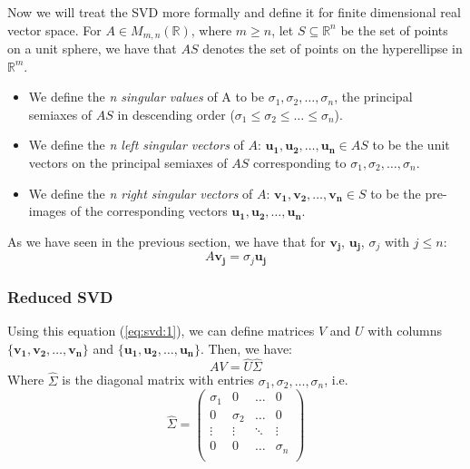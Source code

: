 \documentclass[12pt,reqno,twoside,titlepage]{article}
\theoremstyle{definition}
\begin{document}
Now we will treat the SVD more formally and define it for finite dimensional real vector space.
For $A \in M_{m,n}(\mathbb{R})$, where $m \geq n$, let  $S \subseteq \mathbb{R}^n$ be the set of points on a unit sphere, we have that $AS$ denotes the set of points on the hyperellipse in $\mathbb{R}^m$.
\begin{itemize}
\item We define the \emph{n singular values} of A to be $\sigma_1, \sigma_2, \dots, \sigma_n$, the principal semiaxes of $AS$ in descending order ($\sigma_1 \leq \sigma_2 \leq \dots \leq \sigma_n$).
\item We define the \emph{n left singular vectors} of $A$: $\mathbf{u_1}, \mathbf{u_2}, \dots, \mathbf{u_n} \in AS$ to be the unit vectors on the principal semiaxes of $AS$ corresponding to $\sigma_1, \sigma_2, \dots, \sigma_n$.
\item We define the \emph{n right singular vectors} of $A$: $\mathbf{v_1}, \mathbf{v_2}, \dots, \mathbf{v_n} \in S$ to be the pre-images of the corresponding vectors $\mathbf{u_1}, \mathbf{u_2}, \dots, \mathbf{u_n}$.
\end{itemize}


As we have seen in the previous section, we have that for $\mathbf{v_j}$, $\mathbf{u_j}$, $\sigma_j$ with $j \leq n$:
\begin{equation}
  \label{eq:svd:1}
  A\mathbf{v_j} = \sigma_j\mathbf{u_j}
\end{equation}
\subsubsection{Reduced SVD}
\label{sec:svd:2:1}

Using this equation (\ref{eq:svd:1}), we can define matrices $V$ and $U$ with columns $\{\mathbf{v_1}, \mathbf{v_2}, \dots, \mathbf{v_n}\}$ and $\{\mathbf{u_1}, \mathbf{u_2}, \dots, \mathbf{u_n}\}$. Then, we have:
\begin{equation}
  \label{eq:svd:2}
  AV  = \hat{U} \hat{\Sigma}
\end{equation}
Where $\hat{\Sigma}$ is the diagonal matrix with entries $\sigma_1, \sigma_2, \dots, \sigma_n$, i.e.\
\[
  \hat{\Sigma} =
  \begin{pmatrix}
    \sigma_1 & 0 & \dots & 0 \\
    0 & \sigma_2 &  \dots & 0 \\
    \vdots & \vdots & \ddots & \vdots \\
    0 & 0 & \dots & \sigma_n \\
  \end{pmatrix}
\]
\end{document}
